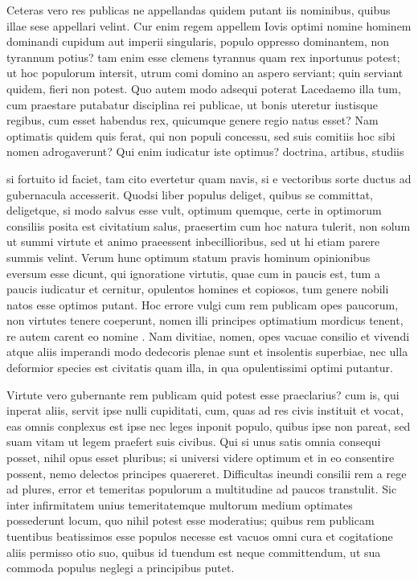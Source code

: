  Ceteras vero res publicas ne appellandas quidem putant iis nominibus, quibus illae sese appellari velint. Cur enim regem appellem Iovis optimi nomine hominem dominandi cupidum aut imperii singularis, populo oppresso dominantem, non tyrannum potius? tam enim esse clemens tyrannus quam rex inportunus potest; ut hoc populorum intersit, utrum comi domino an aspero serviant; quin serviant quidem, fieri non potest. Quo autem modo adsequi poterat Lacedaemo illa tum, cum praestare putabatur disciplina rei publicae, ut bonis uteretur iustisque regibus, cum esset habendus rex, quicumque genere regio natus esset? Nam optimatis quidem quis ferat, qui non populi concessu, sed suis comitiis hoc sibi nomen adrogaverunt? Qui enim iudicatur iste optimus? doctrina, artibus, studiis

 si fortuito id faciet, tam cito evertetur quam navis, si e vectoribus sorte ductus ad gubernacula accesserit. Quodsi liber populus deliget, quibus se committat, deligetque, si modo salvus esse vult, optimum quemque, certe in optimorum consiliis posita est civitatium salus, praesertim cum hoc natura tulerit, non solum ut summi virtute et animo praeessent inbecillioribus, sed ut hi etiam parere summis velint. Verum hunc optimum statum pravis hominum opinionibus eversum esse dicunt, qui ignoratione virtutis, quae cum in paucis est, tum a paucis iudicatur et cernitur, opulentos homines et copiosos, tum genere nobili natos esse optimos putant. Hoc errore vulgi cum rem publicam opes paucorum, non virtutes tenere coeperunt, nomen illi principes optimatium mordicus tenent, re autem carent eo nomine . Nam divitiae, nomen, opes vacuae consilio et vivendi atque aliis imperandi modo dedecoris plenae sunt et insolentis superbiae, nec ulla deformior species est civitatis quam illa, in qua opulentissimi optimi putantur.

 Virtute vero gubernante rem publicam quid potest esse praeclarius? cum is, qui inperat aliis, servit ipse nulli cupiditati, cum, quas ad res civis instituit et vocat, eas omnis conplexus est ipse nec leges inponit populo, quibus ipse non pareat, sed suam vitam ut legem praefert suis civibus. Qui si unus satis omnia consequi posset, nihil opus esset pluribus; si universi videre optimum et in eo consentire possent, nemo delectos principes quaereret. Difficultas ineundi consilii rem a rege ad plures, error et temeritas populorum a multitudine ad paucos transtulit. Sic inter infirmitatem unius temeritatemque multorum medium optimates possederunt locum, quo nihil potest esse moderatius; quibus rem publicam tuentibus beatissimos esse populos necesse est vacuos omni cura et cogitatione aliis permisso otio suo, quibus id tuendum est neque committendum, ut sua commoda populus neglegi a principibus putet.

